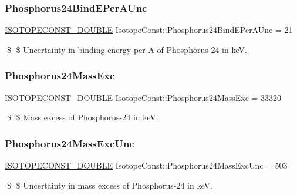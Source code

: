 \subsubsection{\texorpdfstring{Phosphorus24\+Bind\+E\+Per\+A\+Unc}{Phosphorus24BindEPerAUnc}}
{\footnotesize\ttfamily \mbox{\hyperlink{group___isotope_const-_macros_ga8f45a7272ce02c0b4c65c44636ed719a}{I\+S\+O\+T\+O\+P\+E\+C\+O\+N\+S\+T\+\_\+\+D\+O\+U\+B\+LE}} Isotope\+Const\+::\+Phosphorus24\+Bind\+E\+Per\+A\+Unc = 21}

\$ \$ Uncertainty in binding energy per A of Phosphorus-\/24 in keV. \mbox{\label{group___isotope_const-_phosphorus-_p24_ga2ab004091da2448bbebfe55433806e41}} 
\subsubsection{\texorpdfstring{Phosphorus24\+Mass\+Exc}{Phosphorus24MassExc}}
{\footnotesize\ttfamily \mbox{\hyperlink{group___isotope_const-_macros_ga8f45a7272ce02c0b4c65c44636ed719a}{I\+S\+O\+T\+O\+P\+E\+C\+O\+N\+S\+T\+\_\+\+D\+O\+U\+B\+LE}} Isotope\+Const\+::\+Phosphorus24\+Mass\+Exc = 33320}

\$ \$ Mass excess of Phosphorus-\/24 in keV. \mbox{\label{group___isotope_const-_phosphorus-_p24_gaccfaed1b62ce09132e5041e2878c8ca1}} 
\subsubsection{\texorpdfstring{Phosphorus24\+Mass\+Exc\+Unc}{Phosphorus24MassExcUnc}}
{\footnotesize\ttfamily \mbox{\hyperlink{group___isotope_const-_macros_ga8f45a7272ce02c0b4c65c44636ed719a}{I\+S\+O\+T\+O\+P\+E\+C\+O\+N\+S\+T\+\_\+\+D\+O\+U\+B\+LE}} Isotope\+Const\+::\+Phosphorus24\+Mass\+Exc\+Unc = 503}

\$ \$ Uncertainty in mass excess of Phosphorus-\/24 in keV. \mbox{\label{group___isotope_const-_phosphorus-_p24_ga5eb14453093e53462df978e6527a858e}} 
